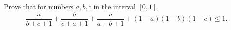 Prove that for numbers $a,b,c$ in the interval $[0,1]$,  \[\frac{a}{b+c+1}+\frac{b}{c+a+1}+\frac{c}{a+b+1}+(1-a)(1-b)(1-c) \le 1.\]